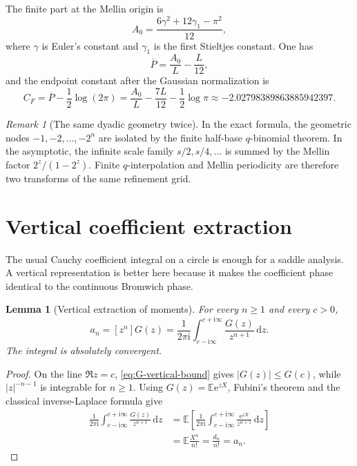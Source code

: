 \documentclass[11pt,oneside]{article}
\newtheorem{lemma}[theorem]{Lemma}
\theoremstyle{definition}
\theoremstyle{remark}
\newtheorem{remark}[theorem]{Remark}
\newcommand{\e}{\mathrm e}
\newcommand{\ii}{\mathrm i}
\newcommand{\dd}{\,\mathrm d}
\newcommand{\E}{\mathbb E}
\begin{document}
The finite part at the Mellin origin is
\begin{equation}
 A_0=\frac{6\gamma^2+12\gamma_1-\pi^2}{12},
\label{eq:A0}
\end{equation}
where $\gamma$ is Euler's constant and $\gamma_1$ is the first Stieltjes constant.  One has
\begin{equation}
 \overline P=\frac{A_0}{L}-\frac L{12},
\label{eq:Pbar}
\end{equation}
and the endpoint constant after the Gaussian normalization is
\begin{equation}
 C_F=\overline P-\frac12\log(2\pi)
 =\frac{A_0}{L}-\frac{7L}{12}-\frac12\log\pi
 \approx-2.02798389863885942397.
\label{eq:CF}
\end{equation}

\begin{remark}[The same dyadic geometry twice]
In the exact formula, the geometric nodes $-1,-2,\ldots,-2^n$ are isolated by the finite half-base $q$-binomial theorem.  In the asymptotic, the infinite scale family $s/2,s/4,\ldots$ is summed by the Mellin factor $2^z/(1-2^z)$.  Finite $q$-interpolation and Mellin periodicity are therefore two transforms of the same refinement grid.
\end{remark}

\section{Vertical coefficient extraction}
\label{sec:vertical-coeff}

The usual Cauchy coefficient integral on a circle is enough for a saddle analysis.  A vertical representation is better here because it makes the coefficient phase identical to the continuous Bromwich phase.

\begin{lemma}[Vertical extraction of moments]
\label{lem:vertical-extraction}
For every $n\ge1$ and every $c>0$,
\begin{equation}
 a_n=[z^n]G(z)=
 \frac1{2\pi\ii}
 \int_{c-\ii\infty}^{c+\ii\infty}
 \frac{G(z)}{z^{n+1}}\dd z.
\label{eq:vertical-extraction}
\end{equation}
The integral is absolutely convergent.
\end{lemma}

\begin{proof}
On the line $\Re z=c$, \eqref{eq:G-vertical-bound} gives
$|G(z)|\le G(c)$, while $|z|^{-n-1}$ is integrable for $n\ge1$.
Using $G(z)=\E\e^{zX}$, Fubini's theorem and the classical inverse-Laplace formula give
\begin{align*}
 \frac1{2\pi\ii}\int_{c-\ii\infty}^{c+\ii\infty}
 \frac{G(z)}{z^{n+1}}\dd z
 &=\E\left[
 \frac1{2\pi\ii}\int_{c-\ii\infty}^{c+\ii\infty}
 \frac{\e^{zX}}{z^{n+1}}\dd z\right]\\
 &=\E\frac{X^n}{n!}=\frac{d_n}{n!}=a_n.
\end{align*}
\end{proof}
\end{document}
